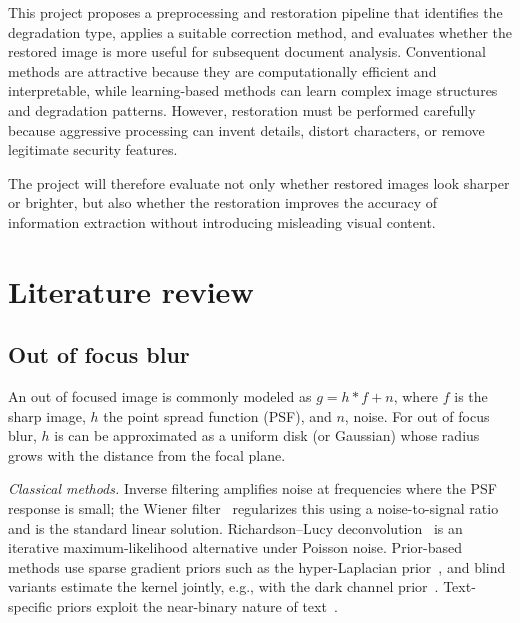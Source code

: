 \documentclass{article}
\begin{document}
This project proposes a preprocessing and restoration pipeline that identifies the degradation type, applies a suitable correction method, and evaluates whether the restored image is more useful for subsequent document analysis. Conventional methods are attractive because they are computationally efficient and interpretable, while learning-based methods can learn complex image structures and degradation patterns. However, restoration must be performed carefully because aggressive processing can invent details, distort characters, or remove legitimate security features.

The project will therefore evaluate not only whether restored images look sharper or brighter, but also whether the restoration improves the accuracy of information extraction without introducing misleading visual content.

\section{Literature review}
\label{sec:format}
\subsection{Out of focus blur}
An out of focused image is commonly modeled as $g = h \ast f + n$, where $f$ is the sharp image, $h$ the point spread function (PSF), and $n$, noise. For out of focus blur, $h$ is can be approximated as a uniform disk (or Gaussian) whose radius grows with the distance from the focal plane.

\textit{Classical methods.} Inverse filtering amplifies noise at frequencies where the PSF response is small; the Wiener filter~\cite{wiener1949,gonzalez2018} regularizes this using a noise-to-signal ratio and is the standard linear solution. Richardson--Lucy deconvolution~\cite{richardson1972,lucy1974} is an iterative maximum-likelihood alternative under Poisson noise. Prior-based methods use sparse gradient priors such as the hyper-Laplacian prior~\cite{krishnan2009}, and blind variants estimate the kernel jointly, e.g., with the dark channel prior~\cite{pan2016}. Text-specific priors exploit the near-binary nature of text~\cite{cho2012,pan2014}.
\end{document}
